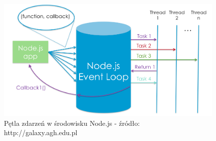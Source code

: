 \documentclass[12pt]{report}
\begin{document}
\begin{figure}[!hb]
\centering
\includegraphics[width=\textwidth,height=\textheight,keepaspectratio]{eventLoop.png} 
\caption{Pętla zdarzeń w środowisku Node.js - źródło: http://galaxy.agh.edu.pl}
\end{figure}
\end{document}
